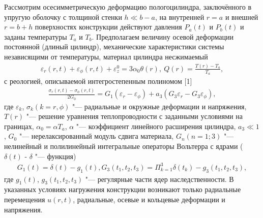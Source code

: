 \vzmscaption

Рассмотрим осесимметрическую деформацию полого цилиндра, заключённого в упругую оболочку с толщиной стенки $h \ll b-a$,
на внутренней $r=a$ и внешней $r=b+h$ поверхностях конструкции действуют давления $P_a(t)$ и $P_b(t)$ и заданы температуры $T_a$ и $T_b$.
Предполагаем величину осевой деформации постоянной (длиный цилиндр), механические характеристики системы независящими от температуры, материал цилиндра несжимаемый
\begin{equation}\label{eq:1}
    \begin{gathered}
        \varepsilon_r(r,t)+\varepsilon_\phi(r,t)+\varepsilon^0_z=3\alpha_0 \theta(r), \ Q(r)=\frac{T(r)-T_a}{T_a},
    \end{gathered}
\end{equation}
\noindent с реологией, описываемой интегростепенным полиномом [1]
\begin{equation}\label{eq:2}
    \begin{gathered}
        \frac{\sigma_r(r,t)-\sigma_\phi(r,t)}{2G_0}=G_1(\varepsilon_r-\varepsilon_\phi)+a_3(G_3\varepsilon_r-G_3\varepsilon_\phi),
    \end{gathered}
\end{equation}
\noindent где $\varepsilon_k$, $\sigma_k(k=r,\phi)$ "--- радиальные и окружные деформации и напряжения,
$T(r) $ "--- решение уравнения теплопроводности с заданными условиями на границах,
$\alpha_0=\alpha T_a$, $\alpha$ "--- коэффициент линейного расширения цилиндра, $a_3 \ll 1$,
$G_0$ "--- нерелаксированный модуль сдвига материала, $G_n(n=1;3)$ "--- нелинейный и полилинейный интегральные операторы Вольтерра с ядрами ($\delta(t)$ - $\delta$ "--- функция)
\begin{equation}\label{eq:3}
    \begin{gathered}
        G_1(t)=\delta(t)-g_1(t), G_3(t_1,t_2,t_3)=\Pi^3_{k=1} \delta(t_k)-g_3(t_1,t_2,t_3),
    \end{gathered}
\end{equation}
\noindent где $g_1(t)$, $g_3(t_1,t_2,t_3)$ "--- регулярные части ядер наследственности.
В указанных условиях нагружения конструкции возникают только радиальные перемещения $u(r,t)$, радиальные, осевые и кольцевые деформации и напряжения.

